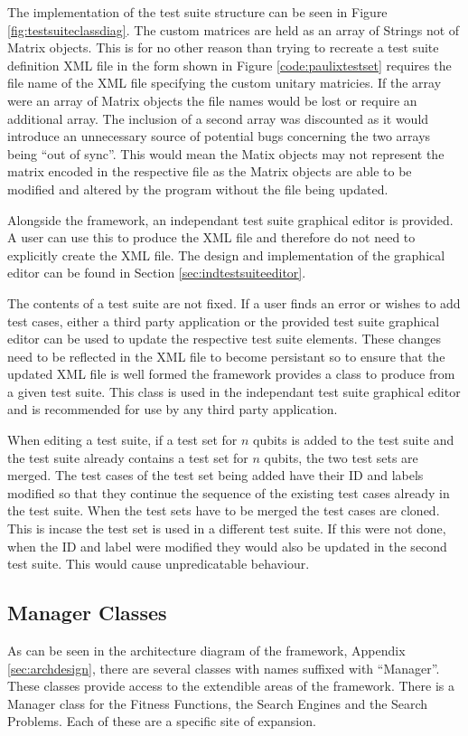 The implementation of the test suite structure can be seen in Figure \ref{fig:testsuiteclassdiag}.
The custom matrices are held as an array of Strings not of Matrix objects.
This is for no other reason than trying to recreate a test suite definition XML file in the form shown in Figure \ref{code:paulixtestset} requires the file name of the XML file specifying the custom unitary matricies.
If the array were an array of Matrix objects the file names would be lost or require an additional array.
The inclusion of a second array was discounted as it would introduce an unnecessary source of potential bugs concerning the two arrays being ``out of sync''.
This would mean the Matix objects may not represent the matrix encoded in the respective file as the Matrix objects are able to be modified and altered by the program without the file being updated.

Alongside the framework, an independant test suite graphical editor is provided.
A user can use this to produce the XML file and therefore do not need to explicitly create the XML file.
The design and implementation of the graphical editor can be found in Section \ref{sec:indtestsuiteeditor}.

The contents of a test suite are not fixed.
If a user finds an error or wishes to add test cases, either a third party application or the provided test suite graphical editor can be used to update the respective test suite elements.
These changes need to be reflected in the XML file to become persistant so to ensure that the updated XML file is well formed the framework provides a class to produce from a given test suite.
This class is used in the independant test suite graphical editor and is recommended for use by any third party application.

When editing a test suite, if a test set for $n$ qubits is added to the test suite and the test suite already contains a test set for $n$ qubits, the two test sets are merged.
The test cases of the test set being added have their ID and labels modified so that they continue the sequence of the existing test cases already in the test suite.
When the test sets have to be merged the test cases are cloned.
This is incase the test set is used in a different test suite.
If this were not done, when the ID and label were modified they would also be updated in the second test suite.
This would cause unpredicatable behaviour.

\subsection{Manager Classes}
\label{sec:manclasses}
As can be seen in the architecture diagram of the framework, Appendix \ref{sec:archdesign}, there are several classes with names suffixed with ``Manager''.
These classes provide access to the extendible areas of the framework.
There is a Manager class for the Fitness Functions, the Search Engines and the Search Problems.
Each of these are a specific site of expansion.

